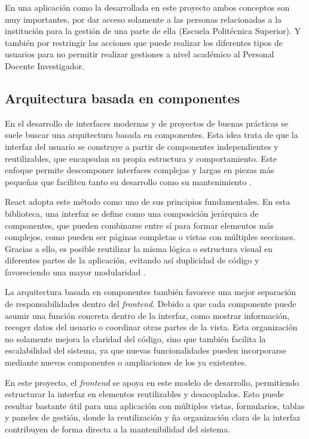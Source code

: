 En una aplicación como la desarrollada en este proyecto ambos conceptos son muy importantes, por dar acceso solamente a las personas relacionadas a la institución para la gestión de una parte de ella (Escuela Politécnica Superior). Y también por restringir las acciones que puede realizar los diferentes tipos de usuarios para no permitir realizar gestiones a nivel académico al Personal Docente Investigador.


\subsection{Arquitectura basada en componentes}

En el desarrollo de interfaces modernas y de proyectos de buenas prácticas se suele buscar una arquitectura basada en componentes. Esta idea trata de que la interfaz del usuario se construye a partir de componentes independientes y reutilizables, que encapsulan su propia estructura y comportamiento. Este enfoque permite descomponer interfaces complejas y largas en piezas más pequeñas que faciliten tanto su desarrollo como su mantenimiento \cite{arq-comp}.

React adopta este método como uno de sus principios fundamentales. En esta biblioteca, una interfaz se define como una composición jerárquica de componentes, que pueden combinarse entre sí para formar elementos más complejos, como pueden ser páginas completas o vistas con múltiples secciones. Gracias a ello, es posible reutilizar la misma lógica o estructura visual en diferentes partes de la aplicación, evitando así duplicidad de código y favoreciendo una mayor modularidad \cite{arq-comp}.

La arquitectura basada en componentes también favorece una mejor separación de responsabilidades dentro del \textit{frontend}. Debido a que cada componente puede asumir una función concreta dentro de la interfaz, como mostrar información, recoger datos del usuario o coordinar otras partes de la vista. Esta organización no solamente mejora la claridad del código, sino que también facilita la escalabilidad del sistema, ya que nuevas funcionalidades pueden incorporarse mediante nuevos componentes o ampliaciones de los ya existentes.

En este proyecto, el \textit{frontend} se apoya en este modelo de desarrollo, permitiendo estructurar la interfaz en elementos reutilizables y desacoplados. Esto puede resultar bastante útil para una aplicación con múltiples vistas, formularios, tablas y paneles de gestión, donde la reutilización y ña organización clara de la interfaz contribuyen de forma directa a la mantenibilidad del sistema.


